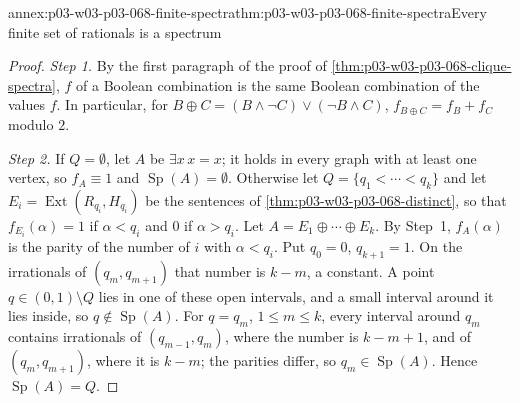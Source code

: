 \begin{annexitem}{annex:p03-w03-p03-068-finite-spectra}{thm:p03-w03-p03-068-finite-spectra}{Every finite set of rationals is a spectrum}
\begin{proof}
\emph{Step 1.}  By the first paragraph of the proof of
\cref{thm:p03-w03-p03-068-clique-spectra}, \(f\) of a Boolean combination is
the same Boolean combination of the values \(f\).  In particular, for
\(B\oplus C=(B\wedge\neg C)\vee(\neg B\wedge C)\), \(f_{B\oplus C}=f_B+f_C\)
modulo \(2\).

\emph{Step 2.}  If \(Q=\emptyset\), let \(A\) be \(\exists x\,x=x\); it holds in
every graph with at least one vertex, so \(f_A\equiv1\) and
\(\operatorname{Sp}(A)=\emptyset\).  Otherwise let \(Q=\{q_1<\cdots<q_k\}\) and let
\(E_i=\operatorname{Ext}(R_{q_i},H_{q_i})\) be the sentences of
\cref{thm:p03-w03-p03-068-distinct}, so that \(f_{E_i}(\alpha)=1\) if
\(\alpha<q_i\) and \(0\) if \(\alpha>q_i\).  Let
\(A=E_1\oplus\cdots\oplus E_k\).  By Step~1, \(f_A(\alpha)\) is the parity of
the number of \(i\) with \(\alpha<q_i\).  Put \(q_0=0\), \(q_{k+1}=1\).  On the
irrationals of \((q_m,q_{m+1})\) that number is \(k-m\), a constant.  A point
\(q\in(0,1)\setminus Q\) lies in one of these open intervals, and a small
interval around it lies inside, so \(q\notin \operatorname{Sp}(A)\).  For \(q=q_m\),
\(1\leq m\leq k\), every interval around \(q_m\) contains irrationals of
\((q_{m-1},q_m)\), where the number is \(k-m+1\), and of \((q_m,q_{m+1})\),
where it is \(k-m\); the parities differ, so \(q_m\in \operatorname{Sp}(A)\).  Hence
\(\operatorname{Sp}(A)=Q\).
\end{proof}
\end{annexitem}

